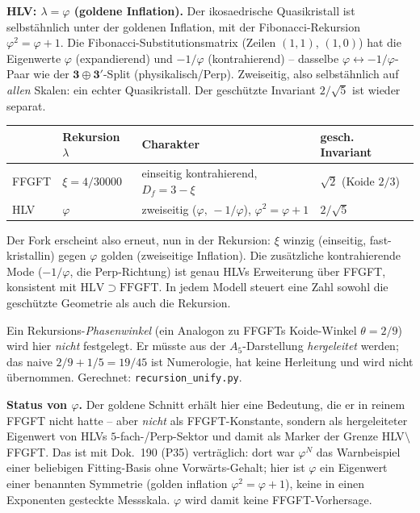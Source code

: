 \textbf{HLV: $\lambda=\varphi$ (goldene Inflation).} Der ikosaedrische Quasikristall ist
selbst\"ahnlich unter der goldenen Inflation, mit der Fibonacci-Rekursion
$\varphi^2=\varphi+1$. Die Fibonacci-Substitutionsmatrix (Zeilen $(1,1)$, $(1,0)$) hat die
Eigenwerte $\varphi$ (expandierend) und $-1/\varphi$ (kontrahierend) -- dasselbe
$\varphi\leftrightarrow-1/\varphi$-Paar wie der $\mathbf 3\oplus\mathbf 3'$-Split
(physikalisch/Perp). Zweiseitig, also selbst\"ahnlich auf \emph{allen} Skalen: ein echter
Quasikristall. Der gesch\"utzte Invariant $2/\sqrt5$ ist wieder separat.

\begin{center}\small
\renewcommand{\arraystretch}{1.2}
\begin{tabular}{@{}p{2.0cm} p{2.7cm} p{5.0cm} p{2.6cm}@{}}
\toprule
 & Rekursion $\lambda$ & Charakter & gesch. Invariant \\
\midrule
FFGFT & $\xi=4/30000$ & einseitig kontrahierend, $D_f=3-\xi$ & $\sqrt2$ (Koide $2/3$) \\
HLV & $\varphi$ & zweiseitig ($\varphi,\,-1/\varphi$), $\varphi^2=\varphi+1$ & $2/\sqrt5$ \\
\bottomrule
\end{tabular}
\end{center}

\noindent Der Fork erscheint also erneut, nun in der Rekursion: $\xi$ winzig (einseitig,
fast-kristallin) gegen $\varphi$ golden (zweiseitige Inflation). Die zus\"atzliche
kontrahierende Mode ($-1/\varphi$, die Perp-Richtung) ist genau HLVs Erweiterung \"uber FFGFT,
konsistent mit $\mathrm{HLV}\supset\mathrm{FFGFT}$. In jedem Modell steuert eine Zahl sowohl
die gesch\"utzte Geometrie als auch die Rekursion.

Ein Rekursions-\emph{Phasenwinkel} (ein Analogon zu FFGFTs Koide-Winkel $\theta=2/9$) wird
hier \emph{nicht} festgelegt. Er m\"usste aus der $A_5$-Darstellung \emph{hergeleitet} werden;
das naive $2/9+1/5=19/45$ ist Numerologie, hat keine Herleitung und wird nicht \"ubernommen.
Gerechnet: \texttt{recursion\_unify.py}.

\medskip\noindent\textbf{Status von $\varphi$.} Der goldene Schnitt erh\"alt hier eine Bedeutung, die er in reinem FFGFT nicht hatte -- aber \emph{nicht} als FFGFT-Konstante, sondern als hergeleiteter Eigenwert von HLVs $5$-fach-/Perp-Sektor und damit als Marker der Grenze HLV$\setminus$FFGFT. Das ist mit Dok.~190 (P35) vertr\"aglich: dort war $\varphi^N$ das Warnbeispiel einer beliebigen Fitting-Basis ohne Vorw\"arts-Gehalt; hier ist $\varphi$ ein Eigenwert einer benannten Symmetrie (golden inflation $\varphi^2=\varphi+1$), keine in einen Exponenten gesteckte Messskala. $\varphi$ wird damit keine FFGFT-Vorhersage.


